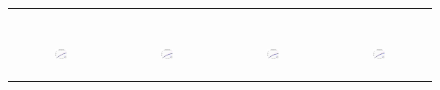 \begin{figure}[ht]
\begin{tabular}{cccc}
\begin{subfigure}[b]{0.22\textwidth}
	  \end{subfigure} \\
	  \begin{subfigure}[b]{0.22\textwidth}
	  	\includegraphics[width=110pt]{images/speedup_friendster10M_maxgraphcut.pdf}
			\caption{}
			\label{appfig:speedup_friendster10M_maxgraphcut}
	  \end{subfigure} &
	  \begin{subfigure}[b]{0.22\textwidth}
	  	\includegraphics[width=110pt]{images/speedup_arabic2005_maxgraphcut.pdf}
			\caption{}
			\label{appfig:speedup_arabic2005_maxgraphcut}
	  \end{subfigure} &
	  \begin{subfigure}[b]{0.22\textwidth}
	  	\includegraphics[width=110pt]{images/speedup_uk2005_maxgraphcut.pdf}
			\caption{}
			\label{appfig:speedup_uk2005_maxgraphcut}
	  \end{subfigure} &
	  \begin{subfigure}[b]{0.22\textwidth}
	  	\includegraphics[width=110pt]{images/speedup_it2004_maxgraphcut.pdf}
			\caption{}
			\label{appfig:speedup_it2004_maxgraphcut}

\end{subfigure}
\end{tabular}
\end{figure}
